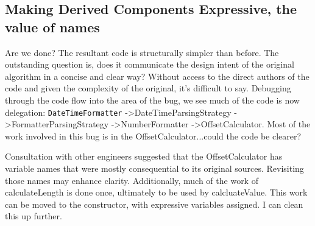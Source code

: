 \subsection{Making Derived Components Expressive, the value of names}
Are we done? The resultant code is structurally simpler than before. The outstanding question is, does it communicate the design intent of the original algorithm in a concise and clear way? Without access to the direct authors of the code and given the complexity of the original, it’s difficult to say. Debugging through the code flow into the area of the bug, we see much of the code is now delegation: \texttt{DateTimeFormatter} -\textgreater DateTimeParsingStrategy -\textgreater FormatterParsingStrategy -\textgreater NumberFormatter -\textgreater OffsetCalculator. Most of the work involved in this bug is in the OffsetCalculator...could the code be clearer?

Consultation with other engineers suggested that the OffsetCalculator has variable names that were mostly consequential to its original sources. Revisiting those names may enhance clarity. Additionally, much of the work of calculateLength is done once, ultimately to be used by calcluateValue. This work can be moved to the constructor, with expressive variables assigned. I can clean this up further.

